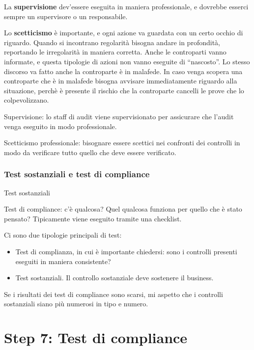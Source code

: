 La \textbf{supervisione} dev'essere eseguita in maniera professionale, e 
dovrebbe esserci sempre un supervisore o un responsabile.

Lo \textbf{scetticismo} è importante, e ogni azione va guardata con un certo 
occhio di riguardo. Quando si incontrano regolarità bisogna andare in 
profondità, reportando le irregolarità in maniera corretta. Anche le controparti 
vanno informate, e questa tipologie di azioni non vanno eseguite di 
``nascosto''. Lo stesso discorso va fatto anche la controparte è in malafede.
In caso venga scopera una controparte che è in malafede bisogna avvisare 
immediatamente riguardo alla situazione, perchè è presente il rischio che la 
controparte cancelli le prove che lo colpevolizzano.





Supervisione: lo staff di audit viene supervisionato per assicurare che l'audit 
venga eseguito in modo professionale.

Scetticismo professionale: bisognare essere scettici nei confronti dei controlli 
in modo da verificare tutto quello che deve essere verificato.


\subsubsection{Test sostanziali e test di compliance}

Test sostanziali 

Test di compliance: c'è qualcosa? Quel qualcosa funziona per quello che è stato 
pensato? Tipicamente viene eseguito tramite una checklist.

Ci sono due tipologie principali di test:
\begin{itemize}
\item Test di complianza, in cui è importante chiedersi: sono i controlli 
presenti eseguiti in maniera consistente?
\item Test sostanziali. Il controllo sostanziale deve sostenere il business. 
\end{itemize}


Se i risultati dei test di compliance sono scarsi, mi aspetto che i controlli 
sostanziali siano più numerosi in tipo e numero.

\section{Step 7: Test di compliance}

